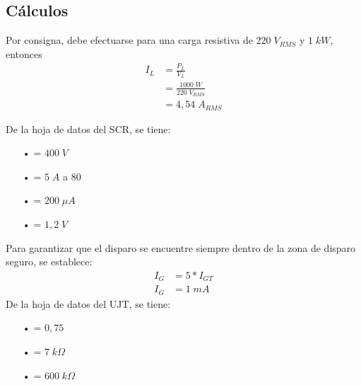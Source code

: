 \documentclass{article}
\begin{document}
\subsection{Cálculos}
Por consigna, debe efectuarse para una carga resistiva de $220\;V_{RMS}$ y $1\;kW$, entonces
\begin{align*}
	I_L &= \frac{P_L}{V_L} \\
		&= \frac{1000\;W}{220\;V_{RMS}} \\
		&= 4,54 \; A_{RMS}
\end{align*}

De la hoja de datos del SCR, se tiene:
%
\begin{itemize}\itemsep0em \itemindent=2em
	\item[•]{= $400 \; V$}
	\item[•]{= $5 \; A$ a 80}
	\item[•]{= $200 \; \mu A$}
	\item[•]{= $1,2 \; V$}
\end{itemize}
Para garantizar que el disparo se encuentre siempre dentro de la zona de disparo seguro, se establece:
\begin{align*}
	I_G &= 5 * I_{GT} \\
	I_G	&= 1 \; mA
\end{align*}
%
De la hoja de datos del UJT, se tiene:
\begin{itemize}\itemsep0em \itemindent=2em
	\item[•]{\makebox[1.8cm]{$\eta$\hfill}= $0,75$}
	\item[•]{= $7 \; k\Omega$}
	\item[•]{= $600 \; k\Omega$}
\end{itemize}
\end{document}
